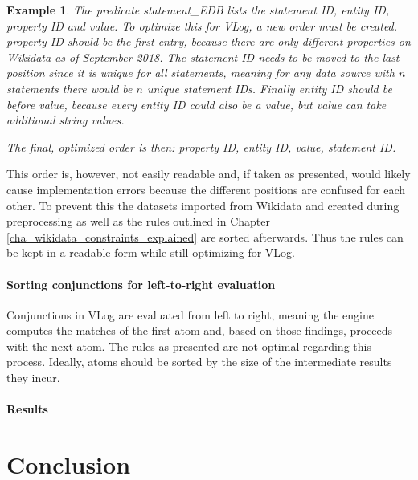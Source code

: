 \documentclass[hyperref,bachelorofscience,fleqn]{cgvpub}
\newtheorem{example}{Example}
\begin{document}
\begin{example}
The predicate \emph{statement\_EDB} lists the \emph{statement ID}, \emph{entity ID}, \emph{property ID} and \emph{value}. To optimize this for VLog, a new order must be created. \emph{property ID} should be the first entry, because there are only  different properties on Wikidata as of September 2018. The \emph{statement ID} needs to be moved to the last position since it is unique for all statements, meaning for any data source with \(n\) statements there would be \(n\) unique \emph{statement IDs}. Finally \emph{entity ID} should be before \emph{value}, because every \emph{entity ID} could also be a \emph{value}, but value can take additional string values.

The final, optimized order is then: \emph{property ID}, \emph{entity ID}, \emph{value}, \emph{statement ID}.
\end{example}

This order is, however, not easily readable and, if taken as presented, would likely cause implementation errors because the different positions are confused for each other. To prevent this the datasets imported from Wikidata and created during preprocessing as well as the rules outlined in Chapter \ref{cha_wikidata_constraints_explained} are sorted afterwards. Thus the rules can be kept in a readable form while still optimizing for VLog.

\subsubsection{Sorting conjunctions for left-to-right evaluation}
Conjunctions in VLog are evaluated from left to right, meaning the engine computes the matches of the first atom and, based on those findings, proceeds with the next atom. The rules as presented are not optimal regarding this process. Ideally, atoms should be sorted by the size of the intermediate results they incur. 

\subsubsection{Results}


\chapter{Conclusion}
\end{document}
